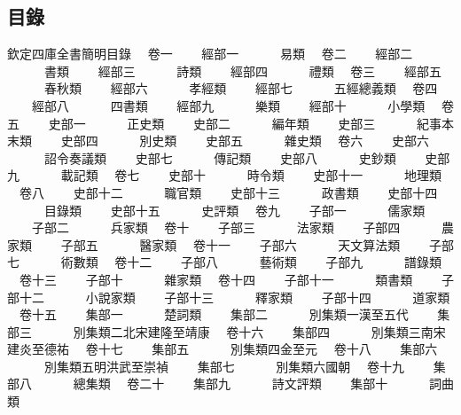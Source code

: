 \documentclass[四库全书文渊阁简明目录]{ltc-guji-digital}
\begin{document}
\begin{正文}
\chapter{目錄}
欽定四庫全書簡明目錄
　卷一
　　經部一
　　　易類
　卷二
　　經部二
　　　書類
　　經部三
　　　詩類
　　經部四
　　　禮類
　卷三
　　經部五
　　　春秋類
　　經部六
　　　孝經類
　　經部七
　　　五經總義類
　卷四
　　經部八
　　　四書類
　　經部九
　　　樂類
　　經部十
　　　小學類
　卷五
　　史部一
　　　正史類
　　史部二
　　　編年類
　　史部三
　　　紀事本末類
　　史部四
　　　別史類
　　史部五
　　　雜史類
　卷六
　　史部六
　　　詔令奏議類
　　史部七
　　　傳記類
　　史部八
　　　史鈔類
　　史部九
　　　載記類
　卷七
　　史部十
　　　時令類
　　史部十一
　　　地理類
　卷八
　　史部十二
　　　職官類
　　史部十三
　　　政書類
　　史部十四
　　　目錄類
　　史部十五
　　　史評類
　卷九
　　子部一
　　　儒家類
　　子部二
　　　兵家類
　卷十
　　子部三
　　　法家類
　　子部四
　　　農家類
　　子部五
　　　醫家類
　卷十一
　　子部六
　　　天文算法類
　　子部七
　　　術數類
　卷十二
　　子部八
　　　藝術類
　　子部九
　　　譜錄類
　卷十三
　　子部十
　　　雜家類
　卷十四
　　子部十一
　　　類書類
　　子部十二
　　　小說家類
　　子部十三
　　　釋家類
　　子部十四
　　　道家類
　卷十五
　　集部一
　　　楚詞類
　　集部二
　　　別集類一漢至五代
　　集部三
　　　別集類二北宋建隆至靖康
　卷十六
　　集部四
　　　別集類三南宋建炎至德祐
　卷十七
　　集部五
　　　別集類四金至元
　卷十八
　　集部六
　　　別集類五明洪武至崇禎
　　集部七
　　　別集類六 國朝 
　卷十九
　　集部八
　　　總集類
　卷二十
　　集部九
　　　詩文評類
　　集部十
　　　詞曲類

\end{正文}
\end{document}
